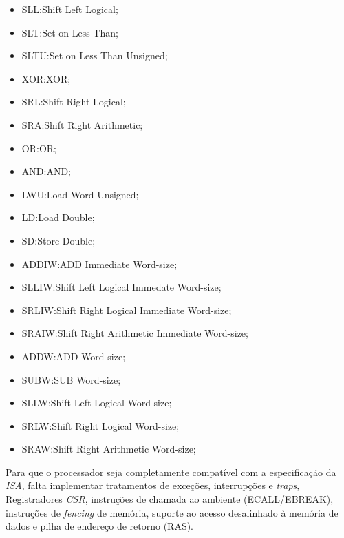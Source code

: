 \begin{itemize}[leftmargin=20mm]
            \item {SLL:\@ Shift Left Logical;}
            \item {SLT:\@ Set on Less Than;}
            \item {SLTU:\@ Set on Less Than Unsigned;}
            \item {XOR:\@ XOR;}
            \item {SRL:\@ Shift Right Logical;}
            \item {SRA:\@ Shift Right Arithmetic;}
            \item {OR:\@ OR;}
            \item {AND:\@ AND;}
            \item {LWU:\@ Load Word Unsigned;}
            \item {LD:\@ Load Double;}
            \item {SD:\@ Store Double;}
            \item {ADDIW:\@ ADD Immediate Word-size;}
            \item {SLLIW:\@ Shift Left Logical Immedate Word-size;}
            \item {SRLIW:\@ Shift Right Logical Immediate Word-size;}
            \item {SRAIW:\@ Shift Right Arithmetic Immediate Word-size;}
            \item {ADDW:\@ ADD Word-size;}
            \item {SUBW:\@ SUB Word-size;}
            \item {SLLW:\@ Shift Left Logical Word-size;}
            \item {SRLW:\@ Shift Right Logical Word-size;}
            \item {SRAW:\@ Shift Right Arithmetic Word-size;}
        \end{itemize}

        {Para que o processador seja completamente compatível com a especificação da \textit{ISA}, falta implementar tratamentos de exceções, interrupções e \textit{traps}, Registradores \textit{CSR}, instruções de chamada ao ambiente (ECALL/EBREAK), instruções de \textit{fencing} de memória, suporte ao acesso desalinhado à memória de dados e pilha de endereço de retorno (RAS).}
